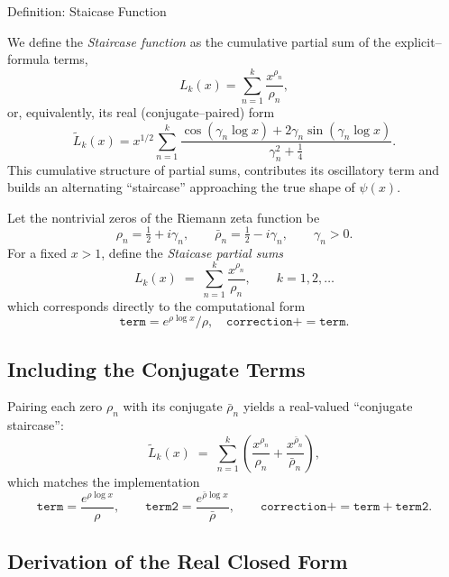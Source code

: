 \documentclass[11pt,a4paper]{article}
\begin{document}
\noindent
Definition: Staicase Function

We define the \emph{Staircase function} as the cumulative partial sum of the
explicit–formula terms,
\[
L_k(x) = \sum_{n=1}^{k}\frac{x^{\rho_n}}{\rho_n},
\]
or, equivalently, its real (conjugate–paired) form
\[
\widetilde{L}_k(x)
=
x^{1/2}
\sum_{n=1}^{k}
\frac{
\cos(\gamma_n\log x) + 2\gamma_n\sin(\gamma_n\log x)
}{
\gamma_n^2+\tfrac14
}.
\]
This cumulative structure of partial sums, contributes its oscillatory term and
builds an alternating ``staircase'' approaching the true shape of $\psi(x)$.

Let the nontrivial zeros of the Riemann zeta function be
\[
\rho_n = \tfrac{1}{2} + i\gamma_n,
\qquad
\bar\rho_n = \tfrac{1}{2} - i\gamma_n,
\qquad
\gamma_n > 0.
\]
For a fixed $x>1$, define the \emph{Staicase partial sums}
\begin{equation}
L_k(x)
\;=\;
\sum_{n=1}^{k}\frac{x^{\rho_n}}{\rho_n},
\qquad k = 1,2,\dots
\label{eq:ladder-complex}
\end{equation}
which corresponds directly to the computational form
\[
\texttt{term} = e^{\rho\log x}/\rho,
\quad
\texttt{correction} {+}{=} \texttt{term}.
\]

\subsection*{Including the Conjugate Terms}

Pairing each zero $\rho_n$ with its conjugate $\bar\rho_n$ yields a
real-valued ``conjugate staircase'':
\begin{equation}
\widetilde{L}_k(x)
\;=\;
\sum_{n=1}^{k}
\!\left(
\frac{x^{\rho_n}}{\rho_n}
+
\frac{x^{\bar\rho_n}}{\bar\rho_n}
\right),
\label{eq:ladder-paired}
\end{equation}
which matches the implementation
\[
\texttt{term} = \frac{e^{\rho\log x}}{\rho},
\qquad
\texttt{term2} = \frac{e^{\bar\rho\log x}}{\bar\rho},
\qquad
\texttt{correction} {+}{=} \texttt{term} {+} \texttt{term2}.
\]

\subsection*{Derivation of the Real Closed Form}
\end{document}
